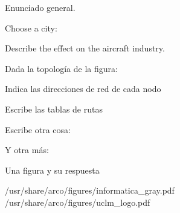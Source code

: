 \documentclass[english]{arco-exam}
\begin{document}
\begin{questions}
\begin{simpleQuestion}{1}
\end{simpleQuestion}


  \begin{multiQuestion}
    Enunciado general.

    \begin{parts}
    \subQuestion[1]
      Choose a city:


    \subQuestion[1]
      Describe the effect on the aircraft industry.

    \end{parts}
  \end{multiQuestion}

  \begin{multiQuestion}
    Dada la topología de la figura:

    \begin{parts}
      \subQuestion[2]
      Indica las direcciones de red de cada nodo


      \subQuestion[3]
      Escribe las tablas de rutas


      \subQuestion[3]
      Escribe otra cosa:


      \subQuestion[3]
      Y otra más:

    \end{parts}

  \end{multiQuestion}


\begin{simpleQuestion}{5}
  Una figura y su respuesta

                     {/usr/share/arco/figures/informatica_gray.pdf}
                     {/usr/share/arco/figures/uclm_logo.pdf}
\end{simpleQuestion}


\end{questions}
\end{document}

